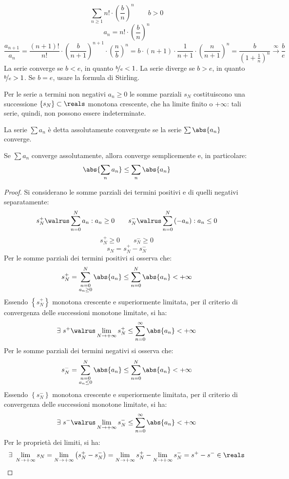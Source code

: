 \begin{example}
  $$\sum_{n\ge1}n!\cdot\left( \frac{b}{n} \right)^n\qquad b>0$$
  $$a_n=n!\cdot\left( \frac{b}{n} \right)^n$$
  $$\frac{a_{n+1}}{a_n}=\frac{\left( n+1 \right)!}{n!}\cdot\left( \frac{b}{n+1} \right)^{n+1}\cdot\left( \frac{n}{b} \right)^n=b\cdot\left( n+1 \right)\cdot \frac{1}{n+1}\cdot\left( \frac{n}{n+1} \right)^n=\frac{b}{\left( 1+\frac{1}{n} \right)^n}\xrightarrow{\infty}\frac{b}{e}$$
  La serie converge se $b<e$, in quanto $\nicefrac{b}{e}<1$. La serie diverge se $b>e$, in quanto $\nicefrac{b}{e}>1$.
  Se $b=e$, usare la formula di Stirling. %
\end{example}

\begin{observation}
  Per le serie a termini non negativi $a_n\ge0$ le somme parziali $s_N$ costituiscono una successione $\left\{ s_N \right\}\subset\reals$ monotona crescente, che ha limite finito o $+\infty$: tali serie, quindi, non possono essere indeterminate.
\end{observation}

\begin{definition}
  La serie $\sum a_n$ è detta assolutamente convergente se la serie $\sum\abs{a_n}$ converge.
\end{definition}

\begin{theorem}
  Se $\sum a_n$ converge assolutamente, allora converge semplicemente e, in particolare:
  $$\abs{\sum_na_n}\le\sum_n\abs{a_n}$$
\end{theorem}
\begin{proof}
  Si considerano le somme parziali dei termini positivi e di quelli negativi separatamente:
  $$s_N^+\walrus \sum_{n=0}^Na_n:a_n\ge0\qquad s_N^-\walrus \sum_{n=0}^N\left( -a_n \right):a_n\le0$$
  $$s_N^+\ge0\qquad s_N^-\ge0$$
  $$s_N=s_N^+-s_N^-$$
  Per le somme parziali dei termini positivi si osserva che:
  $$s_N^+=\sum_{\substack{n=0\\a_n\ge0}}^N\abs{a_n}\le\sum_{n=0}^N\abs{a_n}<+\infty$$
  Essendo $\left\{ s_N^+ \right\}$ monotona crescente e superiormente limitata, per il criterio di convergenza delle successioni monotone limitate, si ha:
  $$\exists\ s^+\walrus\lim_{N\to+\infty}s_N^+\le\sum_{n=0}^\infty\abs{a_n}<+\infty$$
  Per le somme parziali dei termini negativi si osserva che:
  $$s_N^-=\sum_{\substack{n=0\\a_n\le0}}^N\abs{a_n}\le\sum_{n=0}^N\abs{a_n}<+\infty$$
  Essendo $\left\{ s_N^- \right\}$ monotona crescente e superiormente limitata, per il criterio di convergenza delle successioni monotone limitate, si ha:
  $$\exists\ s^-\walrus\lim_{N\to+\infty}s_N^-\le\sum_{n=0}^\infty\abs{a_n}<+\infty$$
  Per le proprietà dei limiti, si ha:
  $$\exists\ \lim_{N\to+\infty}s_N=\lim_{N\to+\infty}\left( s_N^+-s_N^- \right)=\lim_{N\to+\infty}s_N^+-\lim_{N\to+\infty}s_N^-=s^+-s^-\in\reals$$
\end{proof}

